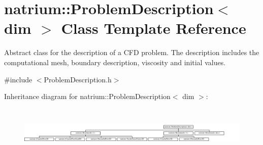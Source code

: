 \hypertarget{classnatrium_1_1ProblemDescription}{\section{natrium\-:\-:Problem\-Description$<$ dim $>$ Class Template Reference}
\label{classnatrium_1_1ProblemDescription}
}


Abstract class for the description of a C\-F\-D problem. The description includes the computational mesh, boundary description, viscosity and initial values.  




{\ttfamily \#include $<$Problem\-Description.\-h$>$}

Inheritance diagram for natrium\-:\-:Problem\-Description$<$ dim $>$\-:\begin{figure}[H]
\begin{center}
\leavevmode
\includegraphics[height=2.545455cm]{classnatrium_1_1ProblemDescription}
\end{center}
\end{figure}
